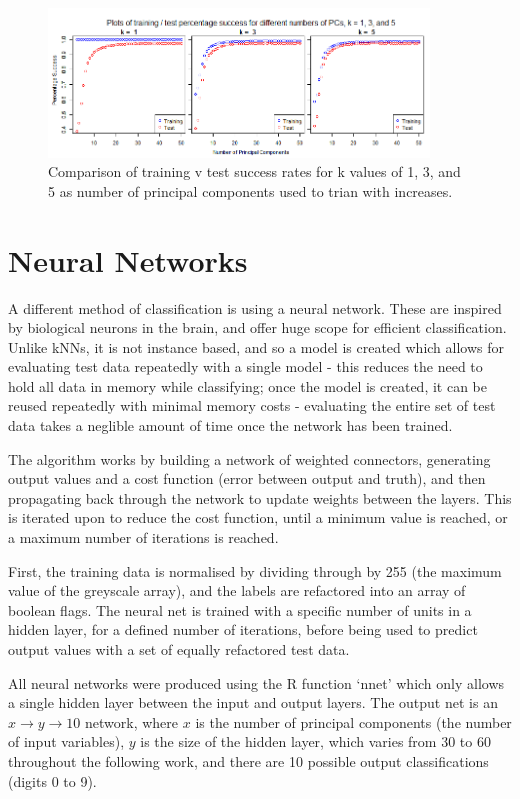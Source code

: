 \documentclass[11pt]{article} %
\begin{document}
\begin{figure}[htb!]
\includegraphics[width = 0.9\textwidth]{pca_kvar_traintest.png}
\caption{Comparison of training v test success rates for k values of 1, 3, and 5 as number of principal components used to trian with increases.} 
\label{fig:pca_rkvar}
\end{figure}




\section{Neural Networks}

A different method of classification is using a neural network. These are inspired by biological neurons in the brain, and offer huge scope for efficient classification. Unlike kNNs, it is not instance based, and so a model is created which allows for evaluating test data repeatedly with a single model - this reduces the need to hold all data in memory while classifying; once the model is created, it can be reused repeatedly with minimal memory costs - evaluating the entire set of test data takes a neglible amount of time once the network has been trained.

The algorithm works by building a network of weighted connectors, generating output values and a cost function (error between output and truth), and then propagating back through the network to update weights between the layers. This is iterated upon to reduce the cost function, until a minimum value is reached, or a maximum number of iterations is reached. 

First, the training data is normalised by dividing through by 255 (the maximum value of the greyscale array), and the labels are refactored into an array of boolean flags. The neural net is trained with a specific number of units in a hidden layer, for a defined number of iterations, before being used to predict output values with  a set of equally refactored test data. 

All neural networks were produced using the R function `nnet' which only allows a single hidden layer between the input and output layers. The output net is an $x \rightarrow y \rightarrow 10$ network, where $x$ is the number of principal components (the number of input variables), $y$ is the size of the hidden layer, which varies from 30 to 60 throughout the following work, and there are 10 possible output classifications (digits 0 to 9). 
\end{document}
